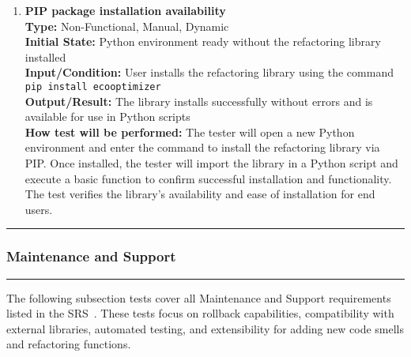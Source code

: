 \documentclass[12pt, titlepage]{article}
\newcommand{\colorrule}{\textcolor{BlueViolet}{\rule{\linewidth}{2pt}}}
\begin{document}
\begin{enumerate}[label={\bf
      \textcolor{Maroon}{test-OPE-\arabic*}}, wide=0pt, font=\itshape]
    \item \textbf{PIP package installation availability} \\[2mm]
      \textbf{Type:} Non-Functional, Manual, Dynamic \\
      \textbf{Initial State:} Python environment ready without the
      refactoring library installed \\
      \textbf{Input/Condition:} User installs the refactoring library
      using the command \texttt{pip install ecooptimizer} \\
      \textbf{Output/Result:} The library installs successfully
      without errors and is available for use in Python scripts \\[2mm]
      \textbf{How test will be performed:} The tester will open a new
      Python environment and enter the command to install the
      refactoring library via PIP. Once installed, the tester will
      import the library in a Python script and execute a basic
      function to confirm successful installation and functionality.
      The test verifies the library’s availability and ease of
      installation for end users.

  \end{enumerate}

  \noindent
  \colorrule

  \subsubsection{Maintenance and Support}
  \colorrule

  \medskip

  \noindent
  The following subsection tests cover all Maintenance and Support
  requirements listed in the SRS~\cite{SRS}. These tests focus on
  rollback capabilities, compatibility with external libraries,
  automated testing, and extensibility for adding new code smells and
  refactoring functions.
\end{document}
